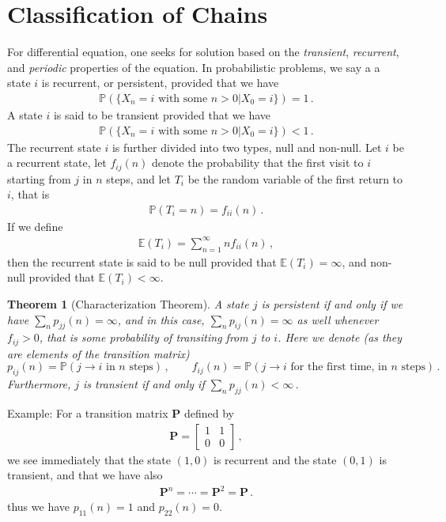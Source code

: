 \documentclass[11pt, onesided]{book}
\theoremstyle{break}
\theoremstyle{break}
\newtheorem{thm}{Theorem}[section]
\newcommand{\bmat}[1]{\begin{bmatrix} #1 \end{bmatrix}}
\newcommand{\example}{\color{green}Example: \color{black}}
\begin{document}
\section[Classification of Chains]{\color{red}Classification of Chains\color{black}}
For differential equation, one seeks for solution based on the \textit{transient}, \textit{recurrent}, and \textit{periodic} properties of the equation. In probabilistic problems, we say a a state $i$ is recurrent, or persistent, provided that we have
\begin{align*}
\mathbb{P}\left(\{X_n = i \text{ with some }n>0 | X_0 = i\}\right) = 1\,.
\end{align*}
A state $i$ is said to be transient provided that we have
\begin{align*}
\mathbb{P}\left(\{X_n = i \text{ with some }n>0 | X_0 = i\}\right) < 1\,.
\end{align*}
The recurrent state $i$ is further divided into two types, null and non-null. Let $i$ be a recurrent state, let $f_{ij}(n)$ denote the probability that the first visit to $i$ starting from $j$ in $n$ steps, and let $T_i$ be the random variable of the first return to $i$, that is
\begin{align*}
\mathbb{P}(T_i = n) = f_{ii}(n)\,.
\end{align*}
If we define
\begin{align*}
\mathbb{E}(T_i) = \sum_{n=1}^\infty n f_{ii}(n)\,,
\end{align*}
then the recurrent state is said to be null provided that $\mathbb{E}(T_i )= \infty$, and non-null provided that $\mathbb{E}(T_i) < \infty$. 

\begin{thm}[Characterization Theorem]
A state $j$ is persistent if and only if we have $\sum_n p_{jj}(n) = \infty$, and in this case, $\sum_n p_{ij}(n) = \infty$ as well whenever $f_{ij}>0$, that is some probability of transiting from $j$ to $i$. Here we denote (as they are elements of the transition matrix)
$$
p_{ij}(n) = \mathbb{P}(j \to i \text{ in $n$ steps})\,,\qquad
f_{ij}(n) = \mathbb{P}(j \to i \text{ for the first time, in $n$ steps})\,.
$$
Furthermore, $j$ is transient if and only if $
\sum_{n}p_{jj}(n) <\infty\,.$%
\end{thm}

\example For a transition matrix $\mathbf{P}$ defined by
\begin{align*}
\mathbf{P} = \bmat{1 & 1 \\ 0 & 0}\,,
\end{align*}
we see immediately that the state $(1,0)$ is recurrent and the state $(0,1)$ is transient, and that we have also
\begin{align*}
\mathbf{P}^n =\cdots =  \mathbf{P}^2 = \mathbf{P}\,.
\end{align*}
thus we have $p_{11}(n) = 1$ and $p_{22}(n) = 0$.\\
\end{document}

